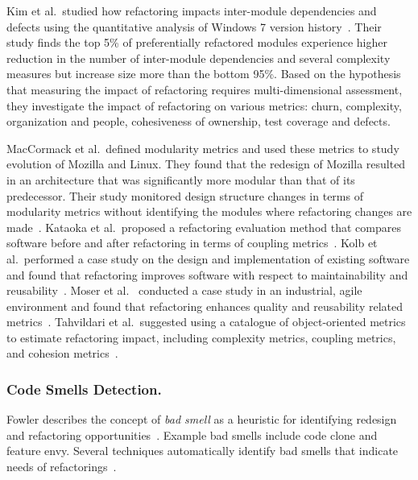 Kim et al.~studied how refactoring impacts inter-module dependencies and defects using the quantitative analysis of Windows 7 version history~\cite{Kim2014:EmpiricalStudy}. Their study finds the top 5\% of preferentially refactored modules experience higher reduction in the number of inter-module dependencies and several complexity measures but increase size more than the bottom 95\%. Based on the hypothesis that measuring the impact of refactoring requires multi-dimensional assessment, they investigate the impact of refactoring on various metrics: churn, complexity, organization and people, cohesiveness of ownership, test coverage and defects.     

MacCormack et al.~defined modularity metrics and used these metrics to study evolution of Mozilla and Linux. They found that the redesign of Mozilla resulted in an architecture that was significantly more modular than that of its predecessor. Their study monitored design structure changes in terms of modularity metrics without identifying the modules where refactoring changes are made~\cite{MacCormack2006:study}. Kataoka et al.~proposed a refactoring evaluation method that compares software before and after refactoring in terms of coupling metrics~\cite{Kataoka2002:metric}. Kolb et al.~performed a case study on the design and implementation of existing software and found that refactoring improves software with respect to maintainability and reusability~\cite{Kolb2006:refactoring}. Moser et al.~ conducted a case study in an industrial, agile environment and found that refactoring enhances quality and reusability related metrics~\cite{Moser2006:refactoring}. Tahvildari et al.~suggested using a catalogue of object-oriented metrics to estimate refactoring impact, including complexity metrics, coupling metrics, and cohesion metrics~\cite{Tahvildari2003:MAE}. 

\subsubsection{Code Smells Detection.} 
\label{sec:codesmell} 

Fowler describes the concept of {\em bad smell} as a heuristic for identifying redesign and refactoring opportunities~\cite{1999:RID}. Example bad smells include code clone and feature envy. Several techniques automatically identify bad smells that indicate needs of refactorings~\cite{Tsantalis2009:extractmethod,Tsantalis2009:movemethod,Tsantalis2008:jdeodorant}. 

